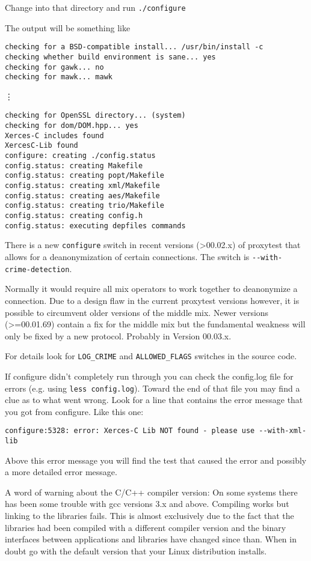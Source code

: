 \documentclass{article}
\begin{document}
Change into that directory and run \verb|./configure| 

The output will be something like 
\begin{verbatim}
checking for a BSD-compatible install... /usr/bin/install -c
checking whether build environment is sane... yes
checking for gawk... no
checking for mawk... mawk
\end{verbatim}
\vdots
\begin{verbatim}
checking for OpenSSL directory... (system)
checking for dom/DOM.hpp... yes
Xerces-C includes found
XercesC-Lib found
configure: creating ./config.status
config.status: creating Makefile
config.status: creating popt/Makefile
config.status: creating xml/Makefile
config.status: creating aes/Makefile
config.status: creating trio/Makefile
config.status: creating config.h
config.status: executing depfiles commands
\end{verbatim}

There is a new \verb|configure| switch in recent versions (>00.02.x)
of proxytest that allows for a deanonymization of certain connections.
The switch is \verb|--with-crime-detection|. 

Normally it would require all mix operators to work together to
deanonymize a connection. Due to a design flaw in the current
proxytest versions however, it is possible to circumvent older
versions of the middle mix. Newer versions (>=00.01.69) contain a fix
for the middle mix but the fundamental weakness will only be fixed by
a new protocol. Probably in Version 00.03.x.

For details look for \verb|LOG_CRIME| and \verb|ALLOWED_FLAGS|
switches in the source code.


If configure didn't completely run through you can check the config.log file for 
errors (e.g. using \verb|less config.log|). 
Toward the end of that file you may find a clue as to what went wrong. 
Look for a line that contains the error message that you got from configure. 
Like this one:
\begin{verbatim}
configure:5328: error: Xerces-C Lib NOT found - please use --with-xml-lib
\end{verbatim}
Above this error message you will find the test that caused the error and
possibly a more detailed error message.

A word of warning about the C/C++ compiler version: On some systems
there has been some trouble with gcc versions 3.x and above. Compiling
works but linking to the libraries fails. This is almost exclusively
due to the fact that the libraries had been compiled with a different
compiler version and the binary interfaces between applications and
libraries have changed since than. When in doubt go with the
default version that your Linux distribution installs.
\end{document}
